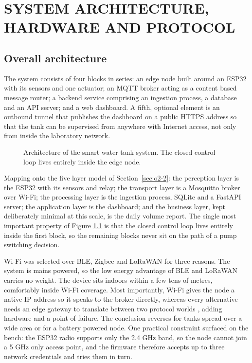 \chapter{SYSTEM ARCHITECTURE, HARDWARE AND PROTOCOL}
\label{chap:arch}

\section{Overall architecture}
\label{sec:o3-1}

The system consists of four blocks in series: an edge node built around an ESP32 with its sensors and one actuator; an MQTT broker acting as a content based message router; a backend service comprising an ingestion process, a database and an API server; and a web dashboard. A fifth, optional element is an outbound tunnel that publishes the dashboard on a public HTTPS address so that the tank can be supervised from anywhere with Internet access, not only from inside the laboratory network.

\begin{figure}[H]
    \centering
    \resizebox{\textwidth}{!}{}
    \caption{Architecture of the smart water tank system. The closed control loop lives entirely inside the edge node.}
    \label{fig:kientruc}
\end{figure}

Mapping onto the five layer model of Section~\ref{sec:o2-2}: the perception layer is the ESP32 with its sensors and relay; the transport layer is a Mosquitto broker over Wi-Fi; the processing layer is the ingestion process, SQLite and a FastAPI server; the application layer is the dashboard; and the business layer, kept deliberately minimal at this scale, is the daily volume report. The single most important property of Figure \ref{fig:kientruc} is that the closed control loop lives entirely inside the first block, so the remaining blocks never sit on the path of a pump switching decision.

Wi-Fi was selected over BLE, Zigbee and LoRaWAN for three reasons. The system is mains powered, so the low energy advantage of BLE and LoRaWAN carries no weight. The device sits indoors within a few tens of metres, comfortably inside Wi-Fi coverage. Most importantly, Wi-Fi gives the node a native IP address so it speaks to the broker directly, whereas every alternative needs an edge gateway to translate between two protocol worlds \cite{slide02}, adding hardware and a point of failure. The conclusion reverses for tanks spread over a wide area or for a battery powered node. One practical constraint surfaced on the bench: the ESP32 radio supports only the 2.4 GHz band, so the node cannot join a 5 GHz only access point, and the firmware therefore accepts up to three network credentials and tries them in turn.

